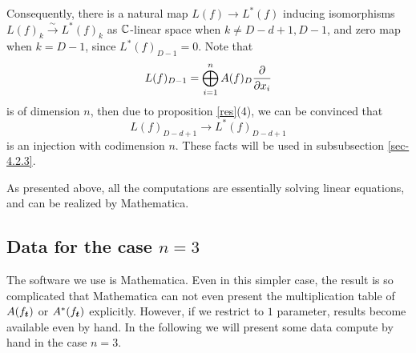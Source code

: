   Consequently, there is a natural map $L(f)\to L^*(f)$ inducing  isomorphisms $L(f)_k \stackrel \sim \to L^*(f)_k$ as ${\mathbb{C}}$-linear space when $k\not=D-d+1, D-1$, and zero map when $k=D-1$, since $L^*(f)_{D-1}=0$. Note that 
  \[L(f)_{D-1}=\bigoplus_{i=1}^n A(f)_D \frac{\partial }{\partial x_i}\]
  is of dimension $n$,  then due to proposition \ref{res}(4), we can be convinced that
  \[L(f)_{D-d+1} \to L^*(f)_{D-d+1}\]
  is an injection with codimension $n$. These facts will be used in subsubsection \ref{sec-4.2.3}.

  As presented above, all the computations are essentially solving linear equations, and can be realized by Mathematica.



  \subsection{Data  for the case \texorpdfstring{$n=3$}{n=3}}\label{sec-3.2}
  The software we use is Mathematica. Even in this simpler case, the result is so complicated that Mathematica can not even present the multiplication table of $A(f_{\boldsymbol t})$ or $A^*(f_{\boldsymbol t})$  explicitly. However, if we restrict to $1$ parameter, results become available even by hand.  In the following we will present some data compute by hand in the case $n=3$.


